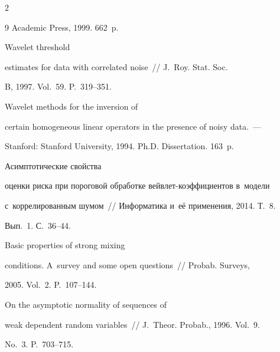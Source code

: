\begin{multicols}{2}
{{\begin{thebibliography}{9}
Academic Press, 1999. 662~p.







 Wavelet threshold


estimates for data with correlated noise~// J.~Roy. Stat. Soc.


 B, 1997. Vol.~59. P.~319--351.







 Wavelet methods for the inversion of


certain homogeneous linear operators in the presence of noisy data.~---


Stanford: Stanford University, 1994. Ph.D. Dissertation. 163~p.







 Асимптотические свойства


оценки риска при пороговой обработке вейв\-лет-ко\-эф\-фи\-ци\-ен\-тов в~модели


с~коррелированным шумом~// Информатика и~её применения, 2014. Т.~8.


Вып.~1. С.~36--44.







 Basic properties of strong mixing


conditions. A~survey and some open questions~// Probab. Surveys,


2005. Vol.~2. P.~107--144.







 On the asymptotic normality of sequences of


weak dependent random variables~// J.~Theor. Probab., 1996. Vol.~9.


No.~3. P.~703--715.


 \end{thebibliography}





 }


 }





\end{multicols}





